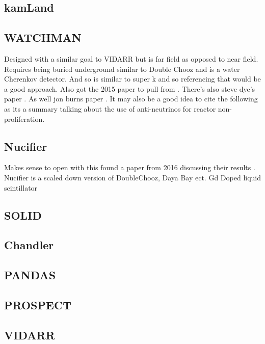 \subsection{kamLand}
\subsection{WATCHMAN}
Designed with a similar goal to VIDARR but is far field as opposed to near field. Requires being buried underground similar to Double Chooz and is a water Cherenkov detector. And so is similar to super k and so referencing that would be a good approach. Also got the 2015 paper to pull from \cite{askins2015physics}. There's also steve dye's paper \cite{dye2017evaluating}. As well jon burns paper \cite{burns2018remote}. It may also be a good idea to cite the following \cite{danielson2019directionally} as its a summary talking about the use of anti-neutrinos for reactor non-proliferation.  
\subsection{Nucifier}
Makes sense to open with this found a paper from 2016 discussing their results \cite{nucifer2016}. Nucifier is a scaled down version of DoubleChooz, Daya Bay ect. Gd Doped liquid scintillator 
\subsection{SOLID}
\subsection{Chandler}
\subsection{PANDAS}
\subsection{PROSPECT}
\subsection{VIDARR}
